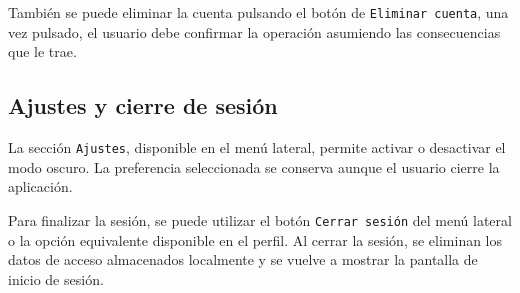 También se puede eliminar la cuenta pulsando el botón de \texttt{Eliminar cuenta}, una vez pulsado, el usuario debe confirmar la operación asumiendo las consecuencias que le trae.

\subsection{Ajustes y cierre de sesión}

La sección \texttt{Ajustes}, disponible en el menú lateral, permite activar o desactivar el modo oscuro. La preferencia seleccionada se conserva aunque el usuario cierre la aplicación.

Para finalizar la sesión, se puede utilizar el botón \texttt{Cerrar sesión} del menú lateral o la opción equivalente disponible en el perfil. Al cerrar la sesión, se eliminan los datos de acceso almacenados localmente y se vuelve a mostrar la pantalla de inicio de sesión.



